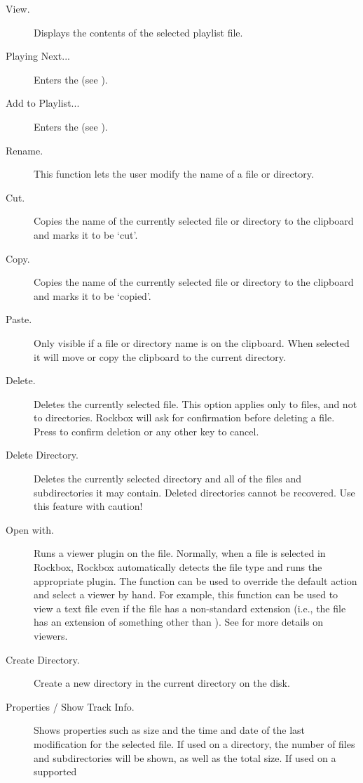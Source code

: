 \begin{description}
\item [View.]
  Displays the contents of the selected playlist file.
\item [Playing Next...]
  Enters the  (see ).
\item [Add to Playlist...]
  Enters the  (see
  ).
\item [Rename.]
  This function lets the user modify the name of a file or directory.
\item [Cut.]
  Copies the name of the currently selected file or directory to the clipboard
  and marks it to be `cut'.
\item [Copy.]
  Copies the name of the currently selected file or directory to the clipboard
  and marks it to be `copied'.
\item [Paste.]
  Only visible if a file or directory name is on the clipboard. When selected
  it will move or copy the clipboard to the current directory.
\item [Delete.]
  Deletes the currently selected file. This option applies only to files, and
  not to directories. Rockbox will ask for confirmation before deleting a file.
  Press \ActionYesNoAccept{}
  to confirm deletion or any other key to cancel.
\item [Delete Directory.]
  Deletes the currently selected directory and all of the files and subdirectories
  it may contain. Deleted directories cannot be recovered. Use this feature with
  caution!
\item [Open with.]
  Runs a viewer plugin on the file. Normally, when a file is selected in Rockbox,
  Rockbox automatically detects the file type and runs the appropriate plugin.
  The  function can be used to override the default action and
  select a viewer by hand.
  For example, this function can be used to view a text file
  even if the file has a non-standard extension (i.e., the file has an extension
  of something other than ). See 
  for more details on viewers.
\item [Create Directory.]
  Create a new directory in the current directory on the disk.
\item [Properties / Show Track Info.]
  Shows properties such as size and the time and date of the last modification
  for the selected file. If used on a directory, the number of files and
  subdirectories will be shown, as well as the total size. If used on a supported

\end{description}
